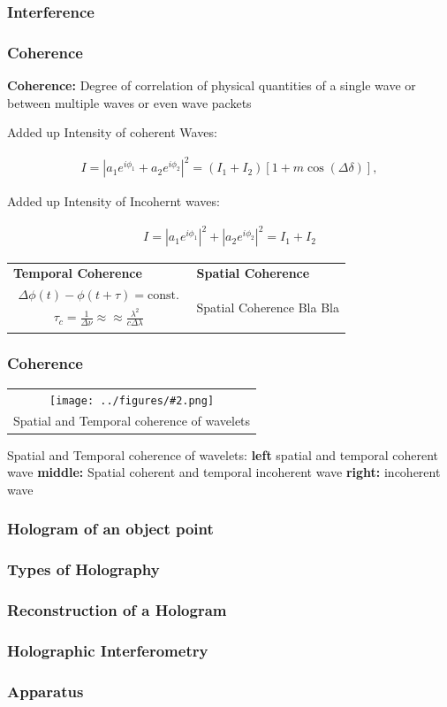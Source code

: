 \documentclass{beamer}
\newcommand{\gra}[3][]{
	\begin{table}
	\centering
	\begin{tabular}[width=\textwidth]{c}
		\texttt{[image: ../figures/\#2.png]}\\
		\small #3
	\end{tabular}
	\end{table}
}
\begin{document}
\begin{frame}
	\frametitle{Interference}
\end{frame}
\begin{frame}
	\frametitle{Coherence}
\textbf{Coherence:} Degree of correlation of physical quantities of a single wave or between multiple waves or even wave packets

Added up Intensity of coherent Waves:

\begin{align}
I=\left| a_1 e^{i \phi_1} + a_2 e^{i \phi_2} \right|^2 = \left(I_1+I_2 \right) \left[ 1 + m \cos(\Delta \delta)\right], 
\end{align}

Added up Intensity of Incohernt waves:

\begin{align}
I=\left| a_1 e^{i \phi_1} \right|^2+ \left| a_2 e^{i \phi_2}\right|^2 = I_1+I_2
\end{align}
\end{frame}
\begin{frame}
\begin{table}
	\centering
	\begin{tabular}{p{5cm}p{5cm}}
		\textbf{Temporal Coherence}&\textbf{Spatial Coherence}\\
		\begin{align*}
		\Delta \phi \left( t \right) - \phi\left( t + \tau\right)  = \text{const.}
		\end{align*}
		\begin{align*}
		\tau_c = \frac{1}{\Delta \nu} \approx\approx \frac{\lambda^2}{c\Delta \lambda}
		\end{align*}
		&
		Spatial Coherence Bla Bla
	\end{tabular}
\end{table}
\end{frame}
\begin{frame}
	\frametitle{Coherence}
\gra[0.8]{Coherence}{Spatial and Temporal coherence of wavelets}{Spatial and Temporal coherence of wavelets: \textbf{left} spatial and temporal coherent wave \textbf{middle:} Spatial coherent and temporal incoherent wave \textbf{right:} incoherent wave }
\end{frame}
\begin{frame}
	\frametitle{Hologram of an object point}
\end{frame}
\begin{frame}
	\frametitle{Types of Holography}
\end{frame}
\begin{frame}
	\frametitle{Reconstruction of a Hologram}
\end{frame}
\begin{frame}
	\frametitle{Holographic Interferometry}
\end{frame}
\begin{frame}
	\frametitle{Apparatus}
\end{frame}
\end{document}
